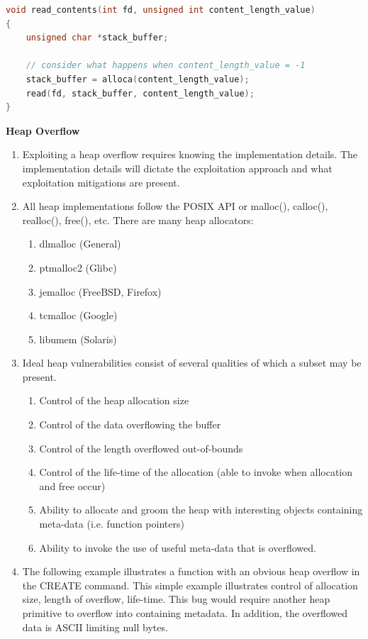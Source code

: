 \documentclass[12pt]{Training}
\begin{document}
\begin{sectionbox}
\begin{lstlisting}[language=C, caption={Stack Corruption}]
void read_contents(int fd, unsigned int content_length_value)
{
	unsigned char *stack_buffer;

	// consider what happens when content_length_value = -1
	stack_buffer = alloca(content_length_value);
	read(fd, stack_buffer, content_length_value);
}
\end{lstlisting}
\end{sectionbox}

\textbf{Heap Overflow}
\begin{enumerate}
  \item Exploiting a heap overflow requires knowing the implementation details. The implementation details will dictate the exploitation approach and what exploitation mitigations are present.
  \item All heap implementations follow the POSIX API or malloc(), calloc(), realloc(), free(), etc.  There are many heap allocators:
    \begin{enumerate}
      \item dlmalloc (General)
      \item ptmalloc2 (Glibc)
      \item jemalloc (FreeBSD, Firefox)
      \item tcmalloc (Google)
      \item libumem (Solaris)
    \end{enumerate}
  \item Ideal heap vulnerabilities consist of several qualities of which a subset may be present.
    \begin{enumerate}
      \item Control of the heap allocation size
      \item Control of the data overflowing the buffer
      \item Control of the length overflowed out-of-bounds
      \item Control of the life-time of the allocation (able to invoke when allocation and free occur)
      \item Ability to allocate and groom the heap with interesting objects containing meta-data (i.e. function pointers)
      \item Ability to invoke the use of useful meta-data that is overflowed.
    \end{enumerate}
  \item The following example illustrates a function with an obvious heap overflow in the CREATE command. This simple example illustrates control of allocation size, length of overflow, life-time. This bug would require another heap primitive to overflow into containing metadata. In addition, the overflowed data is ASCII limiting null bytes.
\end{enumerate}
\end{document}
